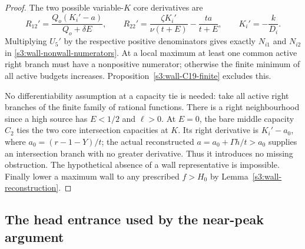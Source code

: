 \documentclass[11pt,reqno]{amsart}
\theoremstyle{definition}
\theoremstyle{remark}
\begin{document}
\begin{proof}
The two possible variable-\(K\) core derivatives are
\[
 R_{12}'=\frac{Q_o(K_i'-a)}{Q_o+\delta E},\qquad
 R_{22}'=\frac{\zeta K_i'}{\nu(t+E)}-\frac{ta}{t+E},\qquad
 K_i'=-\frac{k}{D_i}.
\]
Multiplying \(U_5'\) by the respective positive denominators gives
exactly \(N_{i1}\) and \(N_{i2}\) in
\eqref{s3:wall-nonwall-numerators}. At a local maximum at least one
common active right branch must have a nonpositive numerator;
otherwise the finite minimum of all active budgets increases.
Proposition~\ref{s3:wall-C19-finite} excludes this.

No differentiability assumption at a capacity tie is needed: take
all active right branches of the finite family of rational functions.
There is a right neighbourhood since a high source has
\(E<1/2\) and \(\ell>0\). At \(E=0\), the bare middle capacity
\(C_2\) ties the two core intersection capacities at \(K\).
Its right derivative is \(K_i'-a_0\), where
\(a_0=(r-1-Y)/t\); the actual reconstructed
\(a=a_0+\Gamma h/t>a_0\) supplies an intersection branch with
no greater derivative. Thus it introduces no missing obstruction.
The hypothetical absence of a wall representative is impossible.
Finally lower a maximum wall to any prescribed \(f>H_0\) by
Lemma~\ref{s3:wall-reconstruction}.
\end{proof}

\subsection{The head entrance used by the near-peak argument}
\label{s3:wall-head-entrance-section}
\end{document}
